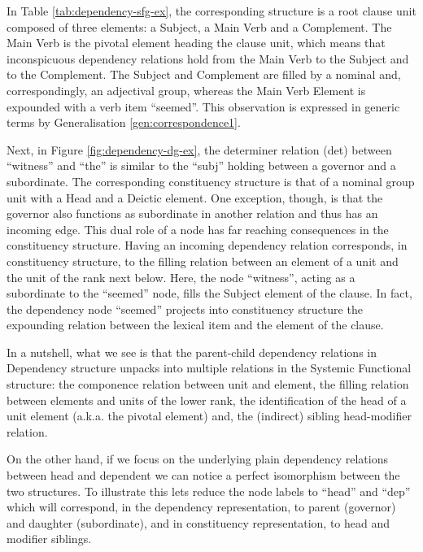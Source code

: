     In Table \ref{tab:dependency-sfg-ex}, the corresponding structure is a root clause unit composed of three elements: a Subject, a Main Verb and a Complement. The Main Verb is the pivotal element heading the clause unit, which means that inconspicuous dependency relations hold from the Main Verb to the Subject and to the Complement. The Subject and Complement are filled by a nominal and, correspondingly, an adjectival group, whereas the Main Verb Element is expounded with a verb item ``seemed''. This observation is expressed in generic terms by Generalisation \ref{gen:correspondence1}. 

    Next, in Figure \ref{fig:dependency-dg-ex}, the determiner relation (det) between ``witness'' and ``the'' is similar to the ``subj'' holding between a governor and a subordinate. The corresponding constituency structure is that of a nominal group unit with a Head and a Deictic element. One exception, though, is that the governor also functions as subordinate in another relation and thus has an incoming edge. This dual role of a node has far reaching consequences in the constituency structure. Having an incoming dependency relation corresponds, in constituency structure, to the filling relation between an element of a unit and the unit of the rank next below. Here, the node ``witness'', acting as a subordinate to the ``seemed'' node, fills the Subject element of the clause. In fact, the dependency node ``seemed'' projects into constituency structure the expounding relation between the lexical item and the element of the clause.

    In a nutshell, what we see is that the parent-child dependency relations in Dependency structure unpacks into multiple relations in the Systemic Functional structure: the componence relation between unit and element, the filling relation between elements and units of the lower rank, the identification of the head of a unit element (a.k.a. the pivotal element) and, the (indirect) sibling head-modifier relation.

    On the other hand, if we focus on the underlying plain dependency relations between head and dependent we can notice a perfect isomorphism between the two structures. To illustrate this lets reduce the node labels to ``head'' and ``dep'' which will correspond, in the dependency representation, to parent (governor) and daughter (subordinate), and in constituency representation, to head and modifier siblings. 

